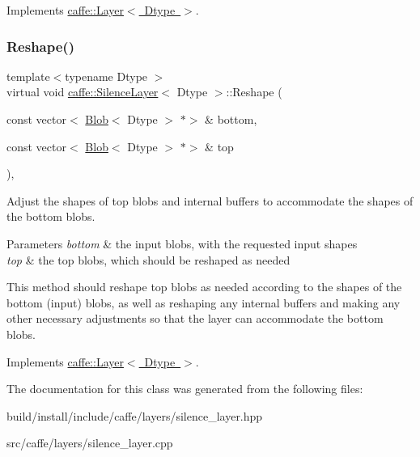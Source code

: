 Implements \mbox{\hyperlink{classcaffe_1_1_layer_a7fe981e8af8d93d587acf2a952be563d}{caffe\+::\+Layer$<$ Dtype $>$}}.

\mbox{\label{classcaffe_1_1_silence_layer_a96a47a49a103e60a681f97eff7bf42f2}} 
\subsubsection{\texorpdfstring{Reshape()}{Reshape()}\hspace{0.1cm}{\footnotesize\ttfamily [2/2]}}
{\footnotesize\ttfamily template$<$typename Dtype $>$ \\
virtual void \mbox{\hyperlink{classcaffe_1_1_silence_layer}{caffe\+::\+Silence\+Layer}}$<$ Dtype $>$\+::Reshape (\begin{DoxyParamCaption}\item[{const vector$<$ \mbox{\hyperlink{classcaffe_1_1_blob}{Blob}}$<$ Dtype $>$ $\ast$$>$ \&}]{bottom,  }\item[{const vector$<$ \mbox{\hyperlink{classcaffe_1_1_blob}{Blob}}$<$ Dtype $>$ $\ast$$>$ \&}]{top }\end{DoxyParamCaption})\hspace{0.3cm}{\ttfamily [inline]}, {\ttfamily [virtual]}}



Adjust the shapes of top blobs and internal buffers to accommodate the shapes of the bottom blobs. 


\begin{DoxyParams}{Parameters}
{\em bottom} & the input blobs, with the requested input shapes \\
\hline
{\em top} & the top blobs, which should be reshaped as needed\\
\hline
\end{DoxyParams}
This method should reshape top blobs as needed according to the shapes of the bottom (input) blobs, as well as reshaping any internal buffers and making any other necessary adjustments so that the layer can accommodate the bottom blobs. 

Implements \mbox{\hyperlink{classcaffe_1_1_layer_a7fe981e8af8d93d587acf2a952be563d}{caffe\+::\+Layer$<$ Dtype $>$}}.



The documentation for this class was generated from the following files\+:\begin{DoxyCompactItemize}
\item 
build/install/include/caffe/layers/silence\+\_\+layer.\+hpp\item 
src/caffe/layers/silence\+\_\+layer.\+cpp\end{DoxyCompactItemize}
